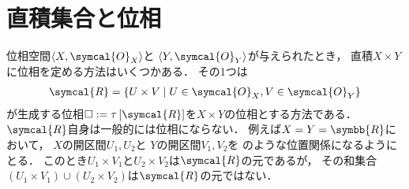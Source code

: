 \documentclass[../main.tex]{subfiles}
\begin{document}
\section{直積集合と位相}
位相空間\(\tuple{X, \symcal{O}_X}\)と \(\tuple{Y, \symcal{O}_Y}\)が与えられたとき，
直積\(X \times Y\)に位相を定める方法はいくつかある．
その1つは
\begin{align*}
    \symcal{R} = \{ U \times V \mid U \in \symcal{O}_X, V \in \symcal{O}_Y\}
\end{align*}
が生成する位相\(\Box := \Generatedtopology{\symcal{R}}\)を\(X \times Y\)の位相とする方法である．
\(\symcal{R}\)自身は一般的には位相にならない．
例えば\(X = Y = \symbb{R}\)において，
\(X\)の開区間\(U_1, U_2\)と
\(Y\)の開区間\(V_1, V_2\)を
のような位置関係になるようにとる．
このとき\(U_1 \times V_1\)と\(U_2 \times V_2\)は\(\symcal{R}\)の元であるが，
その和集合\((U_1 \times V_1) \cup (U_2 \times V_2)\)は\(\symcal{R}\)の元ではない．
\end{document}
